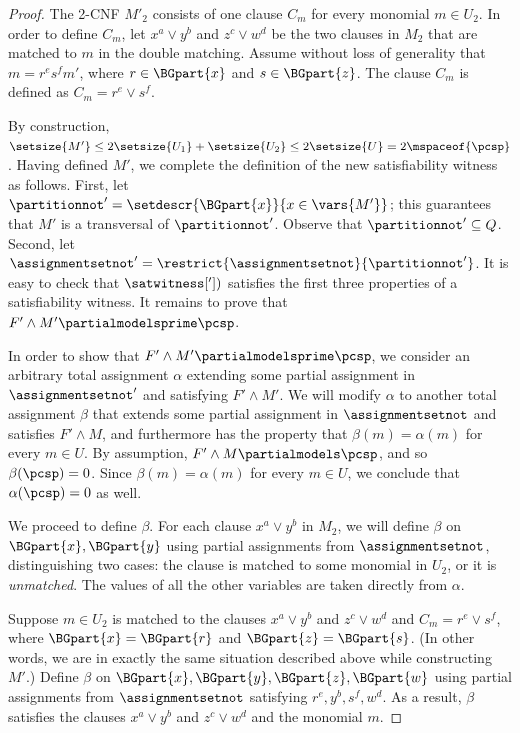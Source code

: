 \documentclass{toc}
\begin{document}
\begin{proof}
The 2-CNF $M'_2$ consists of one clause $C_m$ for every monomial $m \in U_2$. In order to define $C_m$, let $x^a \lor y^b$ and $z^c \lor w^d$ be the two clauses in $M_2$ that are matched to $m$ in the double matching. Assume without loss of generality that $m = r^e s^f m'$, where $r \in \BGpart{x}$ and $s \in \BGpart{z}$. The clause $C_m$ is defined as $C_m = r^e \lor s^f$.

By construction, $\setsize{M'} \leq 2\setsize{U_1} + \setsize{U_2} \leq 2\setsize{U} = 2\mspaceof{\pcsp}$. Having defined $M'$, we complete the definition of the new satisfiability witness as follows. First, let $\partitionnot' = \setdescr{\BGpart{x}}{x\in\vars{M'}}$; this guarantees that $M'$ is a transversal of $\partitionnot'$. Observe that $\partitionnot'\subseteq{Q}$. Second, let $\assignmentsetnot'=\restrict{\assignmentsetnot}{\partitionnot'}$. It is easy to check that $\satwitness['])$ satisfies the first three properties of a satisfiability witness. It remains to prove that $F' \land M' \partialmodelsprime \pcsp$.

In order to show that $F'\land M' \partialmodelsprime \pcsp$, we consider an arbitrary total assignment $\alpha$ extending some partial assignment in $\assignmentsetnot'$ and satisfying $F' \land M'$. We will modify $\alpha$ to another total assignment $\beta$ that extends some partial assignment in $\assignmentsetnot$ and satisfies $F' \land M$, and furthermore has the property that $\beta(m) = \alpha(m)$ for every $m \in U$. By assumption, $F' \land M \partialmodels \pcsp$, and so $\beta(\pcsp) = 0$. Since $\beta(m) = \alpha(m)$ for every $m \in U$, we conclude that $\alpha(\pcsp) = 0$ as well.

We proceed to define $\beta$. For each clause $x^a \lor y^b$ in $M_2$, we will define $\beta$ on $\BGpart{x},\BGpart{y}$ using partial assignments from $\assignmentsetnot$, distinguishing two cases: the clause is matched to some monomial in $U_2$, or it is \emph{unmatched}. The values of all the other variables are taken directly from $\alpha$.

Suppose $m \in U_2$ is matched to the clauses $x^a \lor y^b$ and $z^c \lor w^d$ and $C_m = r^e \lor s^f$, where $\BGpart{x} = \BGpart{r}$ and $\BGpart{z} = \BGpart{s}$. (In other words, we are in exactly the same situation described above while constructing $M'$.) Define $\beta$ on $\BGpart{x},\BGpart{y},\BGpart{z},\BGpart{w}$ using partial assignments from $\assignmentsetnot$ satisfying $r^e,y^b,s^f,w^d$. As a result, $\beta$ satisfies the clauses $x^a \lor y^b$ and $z^c \lor w^d$ and the monomial $m$.


\end{proof}
\end{document}
